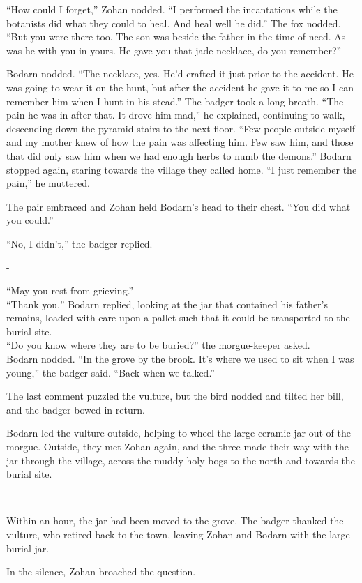 ``How could I forget,'' Zohan nodded. ``I performed the incantations while the botanists did what they could to heal. And heal well he did.'' The fox nodded. ``But you were there too. The son was beside the father in the time of need. As was he with you in yours. He gave you that jade necklace, do you remember?''

Bodarn nodded. ``The necklace, yes. He'd crafted it just prior to the accident. He was going to wear it on the hunt, but after the accident he gave it to me so I can remember him when I hunt in his stead.'' The badger took a long breath. ``The pain he was in after that. It drove him mad,'' he explained, continuing to walk, descending down the pyramid stairs to the next floor. ``Few people outside myself and my mother knew of how the pain was affecting him. Few saw him, and those that did only saw him when we had enough herbs to numb the demons.'' Bodarn stopped again, staring towards the village they called home. ``I just remember the pain,'' he muttered.

The pair embraced and Zohan held Bodarn's head to their chest. ``You did what you could.''

``No, I didn't,'' the badger replied.

-

``May you rest from grieving.''\\
``Thank you,'' Bodarn replied, looking at the jar that contained his father's remains, loaded with care upon a pallet such that it could be transported to the burial site.\\
``Do you know where they are to be buried?'' the morgue-keeper asked.\\
Bodarn nodded. ``In the grove by the brook. It's where we used to sit when I was young,'' the badger said. ``Back when we talked.''

The last comment puzzled the vulture, but the bird nodded and tilted her bill, and the badger bowed in return.

Bodarn led the vulture outside, helping to wheel the large ceramic jar out of the morgue. Outside, they met Zohan again, and the three made their way with the jar through the village, across the muddy holy bogs to the north and towards the burial site.

-

Within an hour, the jar had been moved to the grove. The badger thanked the vulture, who retired back to the town, leaving Zohan and Bodarn with the large burial jar.

In the silence, Zohan broached the question.

